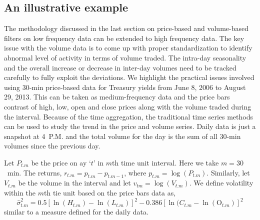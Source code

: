 \subsection{An illustrative example}


The methodology discussed in the last section on price-based and volume-based filters on low frequency data can be extended to high frequency data. The key issue with the volume data is to come up with proper standardization to identify abnormal level of activity in terms of volume traded. The intra-day seasonality and the overall increase or decrease in inter-day volumes need to be tracked carefully to fully exploit the deviations. We highlight the practical issues involved using 30-min price-based data for Treasury yields from June 8, 2006 to August 29, 2013. This can be taken as medium-frequency data and the price bars contrast of high, low, open and close prices along with the volume traded during the interval. Because of the time aggregation, the traditional time series methods can be used to study the trend in the price and volume series. Daily data is just a snapshot at 4~P.M. and the total volume for the day is the sum of all 30-min volumes since the previous day.


Let $P_{t. m}$ be the price on ay `$t$' in $m$th time unit interval. Here we take $m=30$~min. The returns, $r_{t. m}= p_{t. m} - p_{t . m-1}$, where $p_{t. m}=\log(P_{t.m})$. Similarly, let $V_{t.m}$ be the volume in the interval and let $v_{tm}=\log(V_{t. m})$. We define volatility within the $m$th tie unit based on the price bars data as,
	\begin{equation}\label{eqn:hatsigmasq}
	\hat{\sigma}_{t. m}^2= 0.5 [ \ln(H_{t. m}) - \ln(L_{t.m})]^2 - 0.386[\ln(C_{t.m} - \ln(\text{O}_{t . m})]^2
	\end{equation}
similar to a measure defined for the daily data. 

